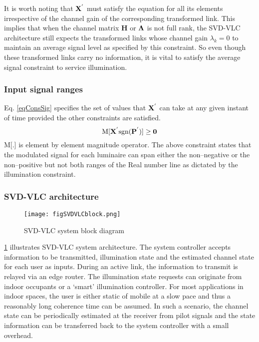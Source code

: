 It is worth noting that ${\bf{X}}^{'}$ must satisfy the equation for all its elements irrespective of the channel gain of the corresponding transformed link. This implies that when the channel matrix {\bf{H}} or ${\bf{\Lambda}}$ is not full rank, the SVD-VLC architecture still expects the transformed links whose channel gain $\lambda_{k} = 0$ to maintain an average signal level as specified by this constraint. So even though these transformed links carry no information, it is vital to satisfy the average signal constraint to service illumination.

\subsubsection{Input signal ranges}
\label{subsubsec:svdvlcSystemRange}

Eq. \eqref{eqConsSig} specifies the set of values that ${\bf{X}}^{'}$ can take at any given instant of time provided the other constraints are satisfied.
	\begin{equation}
	\label{eqConsSig}
	\text{M}[{\bf{X}}^{'}\text{sgn}({\bf{P}}^{'})] \geq {\bf{0}}
\end{equation}
M[.] is element by element magnitude operator. The above constraint states that the modulated signal for each luminaire can span either the non--negative or the non--positive but not both ranges of the Real number line as dictated by the illumination constraint.

\subsubsection{SVD-VLC architecture}
\label{subsubsec:svdvlcSystemArchitecture}

\begin{figure}[!t]
	\centering
		\texttt{[image: figSVDVLCblock.png]}
	\caption{SVD-VLC system block diagram}
	\label{fig:SVDVLCblock}
\end{figure}

\figurename{ \ref{fig:SVDVLCblock}} illustrates SVD-VLC system architecture. The system controller accepts information to be transmitted, illumination state and the estimated channel state for each user as inputs. During an active link, the information to transmit is relayed via an edge router. The illumination state requests can originate from indoor occupants or a `smart' illumination controller. For most applications in indoor spaces, the user is either static of mobile at a slow pace and thus a reasonably long coherence time can be assumed. In such a scenario, the channel state can be periodically estimated at the receiver from pilot signals and the state information can be transferred back to the system controller with a small overhead.

